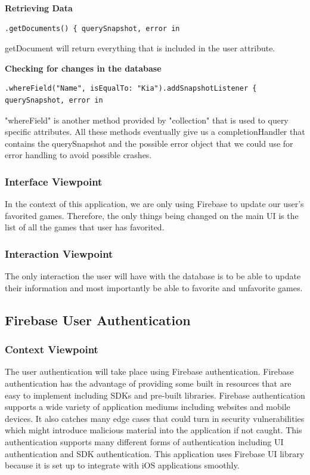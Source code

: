 \documentclass[onecolumn, draftclsnofoot,10pt, compsoc]{IEEEtran}
\begin{document}
\noindent\textbf{Retrieving Data}
\begin{lstlisting}
.getDocuments() { querySnapshot, error in 
\end{lstlisting}
getDocument will return everything that is included in the user attribute. 

\noindent\textbf{Checking for changes in the database}
\begin{lstlisting}
.whereField("Name", isEqualTo: "Kia").addSnapshotListener { querySnapshot, error in 
\end{lstlisting}

\noindent "whereField" is another method provided by "collection" that is used to query specific attributes. All these methods eventually give us a completionHandler that contains the querySnapshot and the possible error object that we could use for error handling to avoid possible crashes.
\subsubsection{Interface Viewpoint}
In the context of this application, we are only using Firebase to update our user's favorited games. Therefore, the only things being changed on the main UI is the list of all the games that user has favorited. 
\subsubsection{Interaction Viewpoint}
The only interaction the user will have with the database is to be able to update their information and most importantly be able to favorite and unfavorite games.
\subsection{Firebase User Authentication \cite{Firebase}}
\subsubsection{Context Viewpoint}
The user authentication will take place using Firebase authentication. Firebase authentication has the advantage of providing some built in resources that are easy to implement including SDKs and pre-built libraries. Firebase authentication supports a wide variety of application mediums including websites and mobile devices. It also catches many edge cases that could turn in security vulnerabilities which might introduce malicious material into the application if not caught. This authentication  supports many different forms of authentication including UI authentication and SDK authentication. This application uses Firebase UI library because it is set up to integrate with iOS applications smoothly.
\end{document}
